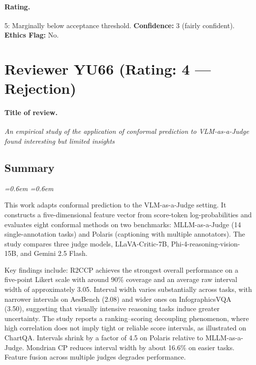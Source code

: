\documentclass[10pt]{article}
\newenvironment{reviewerquote}{%
  \par\addvspace{0.25ex}\begingroup
  \footnotesize\itshape
  \leftskip=0.6em \rightskip=0.6em
  \color{black!78}
  \setlength{\parskip}{0.35ex plus 0.1ex}
}{%
  \endgroup\par\addvspace{0.25ex}
}
\begin{document}
\paragraph{Rating.} 5: Marginally below acceptance threshold. \quad \textbf{Confidence:} 3 (fairly confident). \quad \textbf{Ethics Flag:} No.

\section{Reviewer YU66 (Rating: 4 --- Rejection)}

\paragraph{Title of review.} \emph{An empirical study of the application of conformal prediction to VLM-as-a-Judge found interesting but limited insights}

\subsection*{Summary}
\begin{reviewerquote}
This work adapts conformal prediction to the VLM-as-a-Judge setting. It constructs a five-dimensional feature vector from score-token log-probabilities and evaluates eight conformal methods on two benchmarks: MLLM-as-a-Judge (14 single-annotation tasks) and Polaris (captioning with multiple annotators). The study compares three judge models, LLaVA-Critic-7B, Phi-4-reasoning-vision-15B, and Gemini 2.5 Flash.

Key findings include: R2CCP achieves the strongest overall performance on a five-point Likert scale with around 90\% coverage and an average raw interval width of approximately 3.05. Interval width varies substantially across tasks, with narrower intervals on AesBench (2.08) and wider ones on InfographicsVQA (3.50), suggesting that visually intensive reasoning tasks induce greater uncertainty. The study reports a ranking--scoring decoupling phenomenon, where high correlation does not imply tight or reliable score intervals, as illustrated on ChartQA. Intervals shrink by a factor of 4.5 on Polaris relative to MLLM-as-a-Judge. Mondrian CP reduces interval width by about 16.6\% on easier tasks. Feature fusion across multiple judges degrades performance.
\end{reviewerquote}
\end{document}
